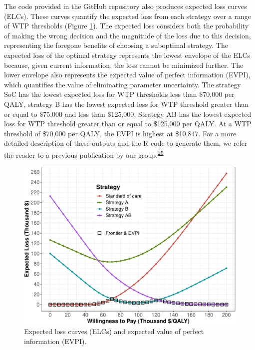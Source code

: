 \documentclass[
]{article}
\begin{document}
The code provided in the GitHub repository also produces expected loss curves (ELCs). These curves quantify the expected loss from each strategy over a range of WTP thresholds (Figure \ref{fig:ELC}). The expected loss considers both the probability of making the wrong decision and the magnitude of the loss due to this decision, representing the foregone benefits of choosing a suboptimal strategy. The expected loss of the optimal strategy represents the lowest envelope of the ELCs because, given current information, the loss cannot be minimized further. The lower envelope also represents the expected value of perfect information (EVPI), which quantifies the value of eliminating parameter uncertainty. The strategy SoC has the lowest expected loss for WTP thresholds less than \$70,000 per QALY, strategy B has the lowest expected loss for WTP threshold greater than or equal to \$75,000 and less than \$125,000. Strategy AB has the lowest expected loss for WTP threshold greater than or equal to \$125,000 per QALY. At a WTP threshold of \$70,000 per QALY, the EVPI is highest at \$10,847. For a more detailed description of these outputs and the R code to generate them, we refer the reader to a previous publication by our group.\textsuperscript{\protect\hyperlink{ref-Alarid-Escudero2019}{25}}

\begin{figure}[H]

{\centering \includegraphics{figs/ELC-1} 

}

\caption{Expected loss curves (ELCs) and expected value of perfect information (EVPI).}\label{fig:ELC}
\end{figure}
\end{document}
